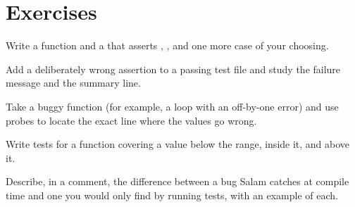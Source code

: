 \section{Exercises}

\exercise Write a function  and a 
that asserts , , and one more
case of your choosing.

\exercise Add a deliberately wrong assertion to a passing test file and study the
failure message and the summary line.

\exercise Take a buggy function (for example, a loop with an off-by-one error) and
use  probes to locate the exact line where the values go wrong.

\exercise Write tests for a  function covering a value below
the range, inside it, and above it.

\exercise Describe, in a comment, the difference between a bug Salam catches at
compile time and one you would only find by running tests, with an example of
each.
